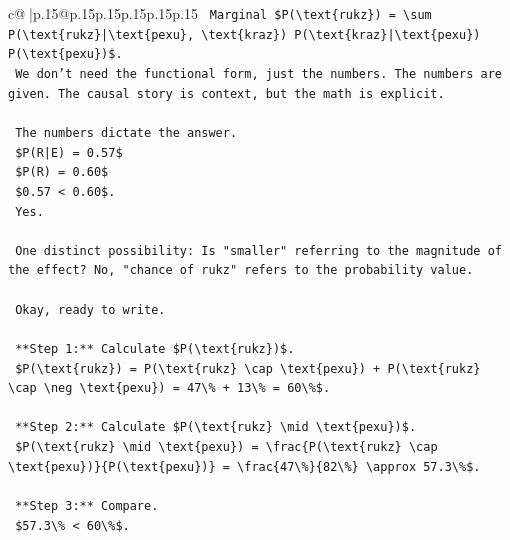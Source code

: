 \documentclass{article}
\begin{document}
{\begin{supertabular}{c@{$\;$}|p{.15\linewidth}@{}p{.15\linewidth}p{.15\linewidth}p{.15\linewidth}p{.15\linewidth}p{.15\linewidth}}
{{{\texttt{    Marginal \$P(\textbackslash{}text\{rukz\}) = \textbackslash{}sum P(\textbackslash{}text\{rukz\}|\textbackslash{}text\{pexu\}, \textbackslash{}text\{kraz\}) P(\textbackslash{}text\{kraz\}|\textbackslash{}text\{pexu\}) P(\textbackslash{}text\{pexu\})\$.} \\
\texttt{    We don't need the functional form, just the numbers. The numbers are given. The causal story is context, but the math is explicit.} \\
\\ 
\texttt{    The numbers dictate the answer.} \\
\texttt{    \$P(R|E) = 0.57\$} \\
\texttt{    \$P(R) = 0.60\$} \\
\texttt{    \$0.57 < 0.60\$.} \\
\texttt{    Yes.} \\
\\ 
\texttt{    One distinct possibility: Is "smaller" referring to the magnitude of the effect? No, "chance of rukz" refers to the probability value.} \\
\\ 
\texttt{    Okay, ready to write.} \\
\\ 
\texttt{    **Step 1:** Calculate \$P(\textbackslash{}text\{rukz\})\$.} \\
\texttt{    \$P(\textbackslash{}text\{rukz\}) = P(\textbackslash{}text\{rukz\} \textbackslash{}cap \textbackslash{}text\{pexu\}) + P(\textbackslash{}text\{rukz\} \textbackslash{}cap \textbackslash{}neg \textbackslash{}text\{pexu\}) = 47\textbackslash{}\% + 13\textbackslash{}\% = 60\textbackslash{}\%\$.} \\
\\ 
\texttt{    **Step 2:** Calculate \$P(\textbackslash{}text\{rukz\} \textbackslash{}mid \textbackslash{}text\{pexu\})\$.} \\
\texttt{    \$P(\textbackslash{}text\{rukz\} \textbackslash{}mid \textbackslash{}text\{pexu\}) = \textbackslash{}frac\{P(\textbackslash{}text\{rukz\} \textbackslash{}cap \textbackslash{}text\{pexu\})\}\{P(\textbackslash{}text\{pexu\})\} = \textbackslash{}frac\{47\textbackslash{}\%\}\{82\textbackslash{}\%\} \textbackslash{}approx 57.3\textbackslash{}\%\$.} \\
\\ 
\texttt{    **Step 3:** Compare.} \\
\texttt{    \$57.3\textbackslash{}\% < 60\textbackslash{}\%\$.} \\
}}}
\end{supertabular}}
\end{document}
